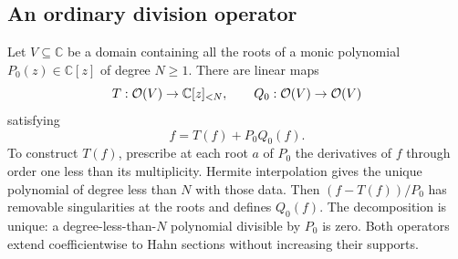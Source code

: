 \documentclass[11pt,a4paper]{article}
\theoremstyle{definition}\newtheorem{definition}[theorem]{Definition}
\theoremstyle{remark}\newtheorem{remark}[theorem]{Remark}
\newcommand{\C}{\mathbb C}\newcommand{\R}{\mathbb R}\newcommand{\N}{\mathbb N}\newcommand{\Z}{\mathbb Z}
\numberwithin{equation}{section}
\begin{document}
\subsection{An ordinary division operator}
Let $V\subseteq\C$ be a domain containing all the roots of a monic polynomial $P_0(z)\in\C[z]$ of degree $N\geq1$. There are linear maps
\[
 T:\hol(V)\to\C[z]_{<N},\qquad
 Q_0:\hol(V)\to\hol(V)
\]
satisfying
\begin{equation}\label{eq:ordinarydivision}
 f=T(f)+P_0Q_0(f).
\end{equation}
To construct $T(f)$, prescribe at each root $a$ of $P_0$ the derivatives of $f$ through order one less than its multiplicity. Hermite interpolation gives the unique polynomial of degree less than $N$ with those data. Then $(f-T(f))/P_0$ has removable singularities at the roots and defines $Q_0(f)$. The decomposition is unique: a degree-less-than-$N$ polynomial divisible by $P_0$ is zero. Both operators extend coefficientwise to Hahn sections without increasing their supports.
\end{document}
